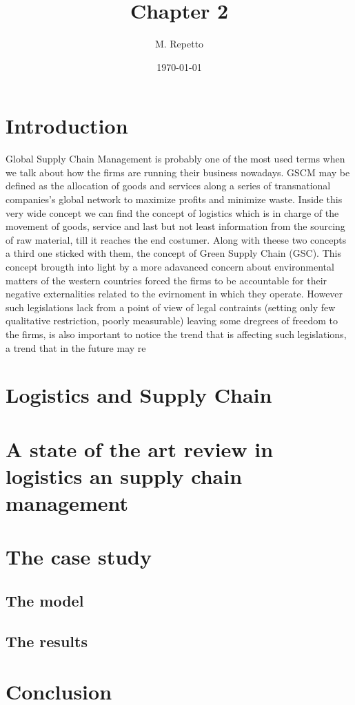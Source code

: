 \documentclass{article}
\begin{document}
\title{Chapter 2}

\author{M. Repetto}

\date{\today}

\maketitle

\begin{abstract}

\end{abstract}

\section{Introduction}
Global Supply Chain Management is probably one of the most used terms when we talk about how the firms are running their business nowadays. GSCM may be defined as the allocation of goods and services along a series of transnational companies's global network to maximize profits and minimize waste. Inside this very wide concept we can find the concept of logistics which is in charge of the movement of goods, service and last but not least information from the sourcing of raw material, till it reaches the end costumer.
Along with theese two concepts a third one sticked with them, the concept of Green Supply Chain (GSC). This concept brougth into light by a more adavanced concern about environmental matters of the western countries forced the firms to be accountable for their negative externalities related to the evirnoment in which they operate. However such legislations lack from a point of view of legal contraints (setting only few qualitative restriction, poorly measurable) leaving some dregrees of freedom to the firms, is also important to notice the trend that is affecting such legislations, a trend that in the future may re

\section{Logistics and Supply Chain}

\section{A state of the art review in logistics an supply chain management}

\section{The case study}
\subsection{The model}
\subsection{The results}

\section{Conclusion}
\end{document}
